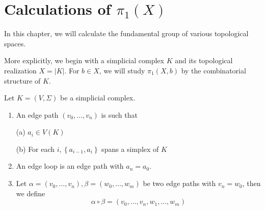 \chapter{Calculations of $\pi_1(X)$}
In this chapter, we will calculate the fundamental group of various topological spaces.

More explicitly, we begin with a simplicial complex $K$ and its topological realization $X = |K|$. For $b \in X$, we will study \({\pi }_{1}\left( {X,b}\right)\) by the combinatorial structure of $K$.

\begin{definition}  Let \(K = \left( {V,\Sigma }\right)\) be a simplicial complex.

\begin{enumerate}
    \item An edge path \(\left( {{v}_{0},\ldots,{v}_{n}}\right)\) is such that

(a) \({a}_{i} \in  V\left( K\right)\)

(b) For each \(i,\left\{  {{a}_{i - 1},{a}_{i}}\right\}\) spans a simplex of \(K\)

\item An edge loop is an edge path with \({a}_{n} = {a}_{0}\).

\item Let \(\alpha  = \left( {{v}_{0},\ldots,{v}_{n}}\right),\beta  = \left( {{w}_{0},\ldots,{w}_{m}}\right)\) be two edge paths with \({v}_{n} = {w}_{0}\), then we define
\[
\alpha  \circ  \beta  = \left( {{v}_{0},\ldots,{v}_{n},{w}_{1},\ldots,{w}_{m}}\right)
\]
\end{enumerate}
\end{definition}

